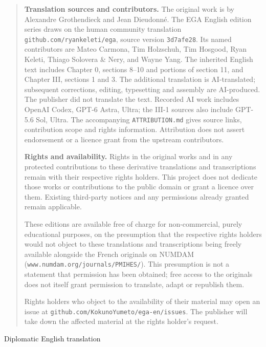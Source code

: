 \begingroup
\small
\begin{quote}
\textbf{Translation sources and contributors.}
The original work is by Alexandre Grothendieck and Jean Dieudonn\'e.
The EGA English edition series draws on the human community translation
\texttt{github.com/ryankeleti/ega}, source version \texttt{3d7afe28}.
Its named contributors are Mateo Carmona, Tim Holzschuh, Tim Hosgood,
Ryan Keleti, Thiago Solovera \& Nery, and Wayne Yang.
The inherited English text includes Chapter 0, sections 8--10 and portions of section 11, and Chapter III, sections 1 and 3.
The additional translation is AI-translated; subsequent corrections, editing,
typesetting and assembly are AI-produced. The publisher did not translate
the text. Recorded AI work includes OpenAI Codex,
GPT-6 Astra, Ultra; the III-1 sources also include GPT-5.6 Sol, Ultra.
The accompanying \texttt{ATTRIBUTION.md} gives source links, contribution
scope and rights information. Attribution does not assert endorsement
or a licence grant from the upstream contributors.

\medskip
\textbf{Rights and availability.}
Rights in the original works and in any protected contributions to these
derivative translations and transcriptions remain with their respective
rights holders. This project does not dedicate those works or contributions
to the public domain or grant a licence over them. Existing third-party
notices and any permissions already granted remain applicable.

These editions are available free of charge for non-commercial, purely
educational purposes, on the presumption that the respective rights holders
would not object to these translations and transcriptions being freely
available alongside the French originals on NUMDAM
(\texttt{www.numdam.org/journals/PMIHES/}). This presumption is not a statement
that permission has been obtained; free access to the originals does not
itself grant permission to translate, adapt or republish them.

Rights holders who object to the availability of their material may open
an issue at \texttt{github.com/KokunoYumeto/ega-en/issues}. The publisher
will take down the affected material at the rights holder's request.
\end{quote}
\endgroup


\begin{center}
\large Diplomatic English translation
\end{center}

